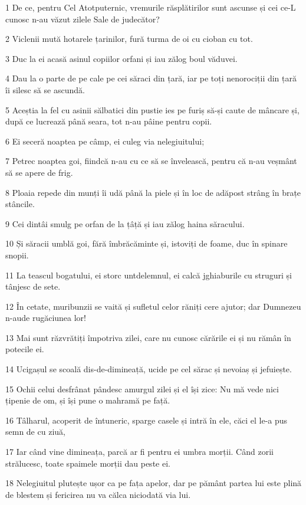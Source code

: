 \par 1 De ce, pentru Cel Atotputernic, vremurile răsplătirilor sunt ascunse și cei ce-L cunosc n-au văzut zilele Sale de judecător?
\par 2 Viclenii mută hotarele țarinilor, fură turma de oi cu cioban cu tot.
\par 3 Duc la ei acasă asinul copiilor orfani și iau zălog boul văduvei.
\par 4 Dau la o parte de pe cale pe cei săraci din țară, iar pe toți nenorociții din țară îi silesc să se ascundă.
\par 5 Aceștia la fel cu asinii sălbatici din pustie ies pe furiș să-și caute de mâncare și, după ce lucrează până seara, tot n-au pâine pentru copii.
\par 6 Ei seceră noaptea pe câmp, ei culeg via nelegiuitului;
\par 7 Petrec noaptea goi, fiindcă n-au cu ce să se învelească, pentru că n-au veșmânt să se apere de frig.
\par 8 Ploaia repede din munți îi udă până la piele și în loc de adăpost strâng în brațe stâncile.
\par 9 Cei dintâi smulg pe orfan de la țâță și iau zălog haina săracului.
\par 10 Și săracii umblă goi, fără îmbrăcăminte și, istoviți de foame, duc în spinare snopii.
\par 11 La teascul bogatului, ei storc untdelemnul, ei calcă jghiaburile cu struguri și tânjesc de sete.
\par 12 În cetate, muribunzii se vaită și sufletul celor răniți cere ajutor; dar Dumnezeu n-aude rugăciunea lor!
\par 13 Mai sunt răzvrătiți împotriva zilei, care nu cunosc cărările ei și nu rămân în potecile ei.
\par 14 Ucigașul se scoală dis-de-dimineață, ucide pe cel sărac și nevoiaș și jefuiește.
\par 15 Ochii celui desfrânat pândesc amurgul zilei și el își zice: Nu mă vede nici țipenie de om, și își pune o mahramă pe față.
\par 16 Tâlharul, acoperit de întuneric, sparge casele și intră în ele, căci el le-a pus semn de cu ziuă,
\par 17 Iar când vine dimineața, parcă ar fi pentru ei umbra morții. Când zorii strălucesc, toate spaimele morții dau peste ei.
\par 18 Nelegiuitul plutește ușor ca pe fața apelor, dar pe pământ partea lui este plină de blestem și fericirea nu va călca niciodată via lui.
